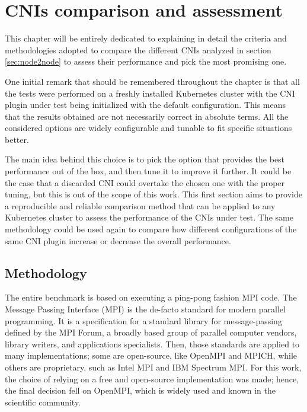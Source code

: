 \chapter{CNIs comparison and assessment}\label{chpt:osu}

This chapter will be entirely dedicated to explaining in detail the criteria and
methodologies adopted to compare the different CNIs analyzed in section
\ref{sec:node2node} to assess their performance and pick the most promising one.

One initial remark that should be remembered throughout the chapter is that all
the tests were performed on a freshly installed Kubernetes cluster with the CNI
plugin under test being initialized with the default configuration.
This means that the results obtained are not necessarily correct in absolute
terms. All the considered options are widely configurable and tunable to fit
specific situations better.

The main idea behind this choice is to pick the option that provides the best
performance out of the box, and then tune it to improve it further.
It could be the case that a discarded CNI could overtake the chosen one with the
proper tuning, but this is out of the scope of this work. This first section
aims to provide a reproducible and reliable comparison method that can be
applied to any Kubernetes cluster to assess the performance of the CNIs under
test. The same methodology could be used again to compare how different
configurations of the same CNI plugin increase or decrease the overall
performance.

\section{Methodology}\label{sec:methodology}

The entire benchmark is based on executing a ping-pong fashion MPI code.
The Message Passing Interface (MPI) \cite{mpi41} is the de-facto standard for
modern parallel programming. It is a specification for a standard library for
message-passing defined by the MPI Forum, a broadly based group of parallel
computer vendors, library writers, and applications specialists. Then, those
standards are applied to many implementations; some are open-source, like
OpenMPI and MPICH, while others are proprietary, such as Intel MPI and IBM
Spectrum MPI.
For this work, the choice of relying on a free and open-source implementation
was made; hence, the final decision fell on OpenMPI, which is widely used and
known in the scientific community.

